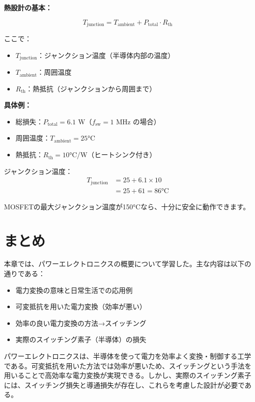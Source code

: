 \begin{screen}
\textbf{熱設計の基本：}

\begin{equation}
T_{\text{junction}} = T_{\text{ambient}} + P_{\text{total}} \cdot R_{\text{th}}
\end{equation}

ここで：
\begin{itemize}
\item $T_{\text{junction}}$：ジャンクション温度（半導体内部の温度）
\item $T_{\text{ambient}}$：周囲温度
\item $R_{\text{th}}$：熱抵抗（ジャンクションから周囲まで）
\end{itemize}

\textbf{具体例：}

\begin{itemize}
\item 総損失：$P_{\text{total}} = 6.1$ W（$f_{\text{sw}}=1$ MHz の場合）
\item 周囲温度：$T_{\text{ambient}} = 25$°C
\item 熱抵抗：$R_{\text{th}} = 10$°C/W（ヒートシンク付き）
\end{itemize}

ジャンクション温度：
\begin{align}
T_{\text{junction}} &= 25 + 6.1 \times 10 \\
&= 25 + 61 = 86 \text{°C}
\end{align}

MOSFETの最大ジャンクション温度が150°Cなら、十分に安全に動作できます。
\end{screen}

\section{まとめ}

本章では、パワーエレクトロニクスの概要について学習した。主な内容は以下の通りである：

\begin{itemize}
\item 電力変換の意味と日常生活での応用例
\item 可変抵抗を用いた電力変換（効率が悪い）
\item 効率の良い電力変換の方法→スイッチング
\item 実際のスイッチング素子（半導体）の損失
\end{itemize}

パワーエレクトロニクスは、半導体を使って電力を効率よく変換・制御する工学である。可変抵抗を用いた方法では効率が悪いため、スイッチングという手法を用いることで高効率な電力変換が実現できる。しかし、実際のスイッチング素子には、スイッチング損失と導通損失が存在し、これらを考慮した設計が必要である。

